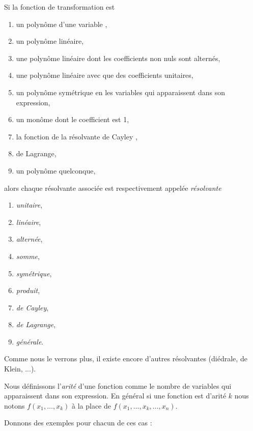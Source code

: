 Si la fonction de transformation est 
\begin{enumerate}
\item un polyn\^ome d'une variable ,
\item un polyn\^ome lin\'eaire,
\item une polyn\^ome lin\'eaire dont les coefficients non nuls sont altern\'es,
\item une polyn\^ome lin\'eaire avec que des coefficients unitaires,
\item un polyn\^ome sym\'etrique en les variables qui apparaissent dans son
expression,
\item un mon\^ome dont le coefficient est 1,
\item la fonction de la r\'esolvante de Cayley ,
\item de Lagrange,
\item un polyn\^ome quelconque,
\end{enumerate}
alors chaque r\'esolvante associ\'ee est respectivement appel\'ee
{\it r\'esolvante }
\begin{enumerate}
\item {\it unitaire},
\item {\it lin\'eaire},
\item {\it altern\'ee},
\item {\it somme},
\item {\it sym\'etrique},
\item {\it produit},
\item {\it de Cayley},
\item {\it de Lagrange},
\item {\it g\'en\'erale}.
\end{enumerate}

Comme nous le verrons plus, il existe encore d'autres r\'esolvantes
(di\'edrale, de Klein, ...).

Nous d\'efinissons l'{\it arit\'e} d'une fonction comme le nombre de
variables qui apparaissent dans son expression. En g\'en\'eral si une fonction
est d'arit\'e $k$ nous notons $f(x_1,\ldots,x_k)$ \`a la place de
$f(x_1,\ldots ,x_k ,\ldots ,x_n)$.

Donnons des exemples pour chacun de ces cas :

